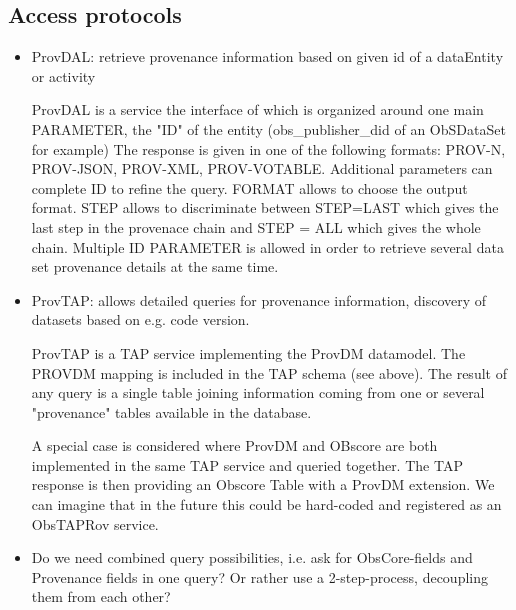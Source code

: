 \subsection{Access protocols}
\begin{itemize}
\item ProvDAL: retrieve provenance information based on given id of a dataEntity or activity

ProvDAL is a service the interface of which is organized around one main PARAMETER, the "ID" of the entity (obs\_publisher\_did of an ObSDataSet for example) The response is given in one of the following formats: PROV-N, PROV-JSON, PROV-XML, PROV-VOTABLE. Additional parameters can complete ID to refine the query. FORMAT allows to choose the output format. STEP allows to discriminate between STEP=LAST which gives the last step in the provenace chain and STEP = ALL which gives the whole chain.
Multiple ID PARAMETER is allowed in order to retrieve several data set provenance details at the same time.
\item ProvTAP: allows detailed queries for provenance information, discovery of datasets based on 
e.g. code version.

ProvTAP is a TAP service implementing the ProvDM datamodel. The PROVDM  mapping is included in the TAP schema (see above). The result of any query is a single table joining information coming from one or several "provenance" tables available in the database. 

A special case is considered where ProvDM and OBscore are both implemented in the same TAP service and queried together. The TAP response is then providing an Obscore Table with a ProvDM extension. We can imagine that in the future this could be hard-coded and registered as an ObsTAPRov service. 


\item Do we need combined query possibilities, i.e. ask for ObsCore-fields and Provenance fields
in one query? Or rather use a 2-step-process, decoupling them from each other?
\end{itemize}



